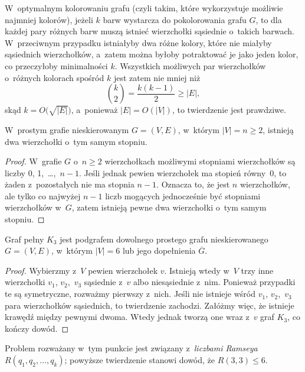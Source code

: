 \subproblem %
W~optymalnym kolorowaniu grafu (czyli takim, które wykorzystuje możliwie najmniej kolorów), jeżeli $k$ barw wystarcza do pokolorowania grafu $G$, to dla każdej pary różnych barw muszą istnieć wierzchołki sąsiednie o~takich barwach. W~przeciwnym przypadku istniałyby dwa różne kolory, które nie miałyby sąsiednich wierzchołków, a~zatem można byłoby potraktować je jako jeden kolor, co przeczyłoby minimalności $k$. Wszystkich możliwych par wierzchołków o~różnych kolorach spośród $k$ jest zatem nie mniej niż
\[
	\binom{k}{2} = \frac{k(k-1)}{2} \ge |E|,
\]
skąd $k=O\bigl(\!\sqrt{|E|}\bigr)$, a~ponieważ $|E|=O(|V|)$, to twierdzenie jest prawdziwe.


\subproblem %
\begin{twierdzenie}
	W~prostym grafie nieskierowanym $G=(V,E)$, w~którym $|V|=n\ge2$, istnieją dwa wierzchołki o~tym samym stopniu.
\end{twierdzenie}
\begin{proof}
W~grafie $G$ o~$n\ge2$ wierzchołkach możliwymi stopniami wierzchołków są liczby 0, 1,~\dots,~$n-1$. Jeśli jednak pewien wierzchołek ma stopień równy~0, to żaden z~pozostałych nie ma stopnia $n-1$. Oznacza to, że jest $n$ wierzchołków, ale tylko co najwyżej $n-1$ liczb mogących jednocześnie być stopniami wierzchołków w~$G$, zatem istnieją pewne dwa wierzchołki o~tym samym stopniu.
\end{proof}

\subproblem %
\begin{twierdzenie}
	Graf pełny $K_3$ jest podgrafem dowolnego prostego grafu nieskierowanego $G=(V,E)$, w~którym $|V|=6$ lub jego dopełnienia $\overline{G}$.
\end{twierdzenie}
\begin{proof}
Wybierzmy z~$V$ pewien wierzchołek $v$. Istnieją wtedy w~$V$ trzy inne wierzchołki $v_1$, $v_2$,~$v_3$ sąsiednie z~$v$ albo niesąsiednie z~nim. Ponieważ przypadki te są symetryczne, rozważmy pierwszy z~nich. Jeśli nie istnieje wśród $v_1$, $v_2$,~$v_3$ para wierzchołków sąsiednich, to twierdzenie zachodzi. Załóżmy więc, że istnieje krawędź między pewnymi dwoma. Wtedy jednak tworzą one wraz z~$v$ graf $K_3$, co kończy dowód.
\end{proof}

Problem rozważany w~tym punkcie jest związany z~\emph{liczbami Ramseya} $R(q_1,q_2,\dots,q_k)$; powyższe twierdzenie stanowi dowód, że $R(3,3)\le6$.

